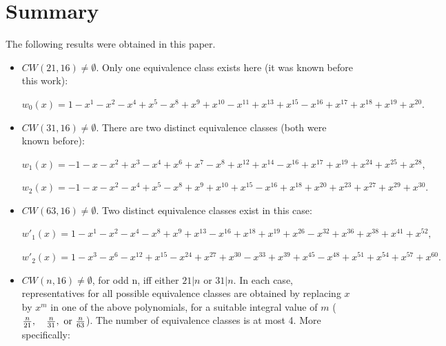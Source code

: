 {{{ %

\section{Summary} \label{sec7}

The following results were obtained in this paper. 
\begin{itemize}
    \item $CW(21,16) \neq \emptyset$. Only one equivalence class exists 
	  here (it was known before this work): 

	  $ w_{0}(x)=1-x^{1}-x^{2}-x^{4}+x^{5}-x^{8}+x^{9}+x^{10}-x^{11}+x^{13}+x^{15}-x^{16}+x^{17}+x^{18}+x^{19}+x^{20}.$
    
    
    \item $CW(31,16) \neq \emptyset$. There are two distinct equivalence 
	  classes (both were known before):
	  
	  $w_{1}(x)=-1-x-x^{2}+x^{3}-x^{4}+x^{6}+x^{7}-x^{8}+x^{12}+x^{14}-x^{16}+x^{17}+x^{19}+x^{24}+x^{25}+x^{28}, $
	  
	  $w_{2}(x)=-1-x-x^{2}-x^{4}+x^{5}-x^{8}+x^{9}+x^{10}+x^{15}-x^{16}+x^{18}+x^{20}+x^{23}+x^{27}+x^{29}+x^{30}. $
    

    \item $CW(63,16) \neq \emptyset$. Two distinct equivalence classes exist 
	  in this case: 
	  
	$w'_{1}(x)=1-x^{1}-x^{2}-x^{4}-x^{8}+x^{9}+x^{13}-x^{16}+x^{18}+x^{19}+x^{26}-x^{32}+x^{36}+x^{38}+x^{41}+x^{52}, $ 
\begin{flushright}
\end{flushright}
	  
	$w'_{2}(x)=1-x^{3}-x^{6}-x^{12}+x^{15}-x^{24}+x^{27}+x^{30}-x^{33}+x^{39}+x^{45}-x^{48}+x^{51}+x^{54}+x^{57}+x^{60}.$
\begin{flushright}
		[an old class: $w'_{2}(x)=w_{0}(x^3)$ with $w_0(x) \in CW(21,16)$ above]
\end{flushright}   

	\item $CW(n,16) \neq \emptyset$, for odd n, iff either $21 | n$ or  
	      $31|n$. In each case, representatives for all possible 
	      equivalence classes are obtained by replacing $x$ by $x^m$ 
	      in one of the above polynomials, for a suitable integral value 
	      of $m$ ($ \frac{n}{21}, \quad \frac{n}{31}, \ {\rm or} \  \frac{n}{63}$). The number of equivalence classes is at most 4. 
	      More specifically: 
	      

\end{itemize}}}}

